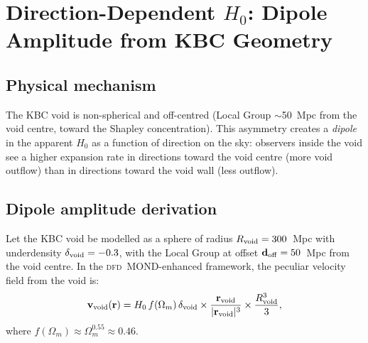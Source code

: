 \documentclass[aps,prd,twocolumn,superscriptaddress,nofootinbib,longbibliography]{revtex4-2}
\newcommand{\DFD}{\textsc{dfd}}
\begin{document}
\section{Direction-Dependent $H_0$: Dipole Amplitude from KBC Geometry}
\label{sec:H0-dipole}

\subsection{Physical mechanism}

The KBC void is non-spherical and off-centred (Local Group $\sim$50~Mpc
from the void centre, toward the Shapley concentration).  This asymmetry
creates a \emph{dipole} in the apparent $H_0$ as a function of direction
on the sky: observers inside the void see a higher expansion rate in
directions toward the void centre (more void outflow) than in directions
toward the void wall (less outflow).

\subsection{Dipole amplitude derivation}

Let the KBC void be modelled as a sphere of radius $R_{\rm void} = 300$~Mpc
with underdensity $\delta_{\rm void} = -0.3$, with the Local Group at
offset $\mathbf{d}_{\rm off} = 50$~Mpc from the void centre.  In the \DFD\
MOND-enhanced framework, the peculiar velocity field from the void is:
\begin{equation}
\mathbf{v}_{\rm void}(\mathbf{r}) = H_0\,f(\Omega_m)\,\delta_{\rm void}
\times\frac{\mathbf{r}_{\rm void}}{|\mathbf{r}_{\rm void}|^3}
\times\frac{R_{\rm void}^3}{3},
\end{equation}
where $f(\Omega_m)\approx\Omega_m^{0.55}\approx0.46$.
\end{document}
